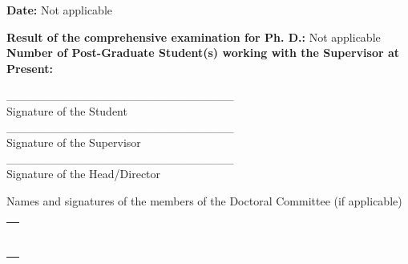 \documentclass[12pt,addpoints,fleqn]{exam}
\def\arraystretch{1.5}
\newcounter{rowcount}
\begin{document}
\begin{questions}
\begin{minipage}[t]{0.45\textwidth}
\end{minipage}
\begin{minipage}[t]{0.45\textwidth}
\textbf{Date:} Not applicable
\end{minipage}
{\bfseries \question
\textbf{Result of the comprehensive examination for Ph. D.:}} Not applicable
{\bfseries \question
\textbf{Number of Post-Graduate Student(s) working with the Supervisor at Present:}}\\
\begin{minipage}[t]{0.4\textwidth}
\flushleft
\vspace{3cm}
\_\_\_\_\_\_\_\_\_\_\_\_\_\_\_\_\_\_\_\_\_\_\_\_\_\_\_\\
Signature of the Student\\
\vspace{3cm}
\_\_\_\_\_\_\_\_\_\_\_\_\_\_\_\_\_\_\_\_\_\_\_\_\_\_\_\\
Signature of the Supervisor\\
\vspace{3cm}
\_\_\_\_\_\_\_\_\_\_\_\_\_\_\_\_\_\_\_\_\_\_\_\_\_\_\_\\
Signature of the Head/Director\\
\end{minipage}
\begin{minipage}[t]{0.5\textwidth}
\flushleft\vspace{1cm}
{\begin{center} Names and signatures of the members of the Doctoral Committee (if applicable) \end{center}}
\begin{center}
\def\arraystretch{2.25}
\begin{tabular}{|@{\stepcounter{rowcount}\makebox[2em][c]{\therowcount.}}|p{}|}
\hline
\\
\hline
\\
\hline
\\
\hline
\\
\hline
\\
\hline
\\
\hline
\\
\hline
\\
\hline
\end{tabular}
\end{center}
\end{minipage}
\end{questions}
\end{document}
